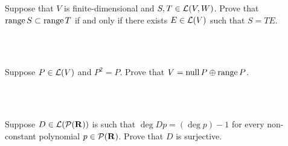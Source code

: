 \begin{exercise}
    Suppose that $V$ is finite-dimensional and $S,T \in \mathcal{L}(V,W)$. Prove that $\operatorname{\text{range}} S \subset \operatorname{\text{range}} T$ if and only if there exists $E \in \mathcal{L}(V)$ such that $S = TE$. \\
\end{exercise}

\begin{solution}
    \\ \td \\
\end{solution}

\begin{exercise}
    Suppose $P \in \mathcal{L}(V)$ and $P^2 = P$. Prove that $V = \operatorname{\text{null}} P \oplus \operatorname{\text{range}} P$. \\
\end{exercise}

\begin{solution}
    \\ \td \\
\end{solution}

\begin{exercise}
    Suppose $D \in \mathcal{L}(\mathcal{P}(\mathbf{R}))$ is such that $\deg Dp = (\deg p) - 1$ for every non-constant polynomial $p \in \mathcal{P}(\mathbf{R})$. Prove that $D$ is surjective. \\
\end{exercise}

\begin{solution}
    \\ \td \\
\end{solution}

\begin{exercise}
    \td \\
\end{exercise}

\begin{solution}
    \\ \td \\
\end{solution}

\begin{exercise}
    \td \\
\end{exercise}

\begin{solution}
    \\ \td \\
\end{solution}

